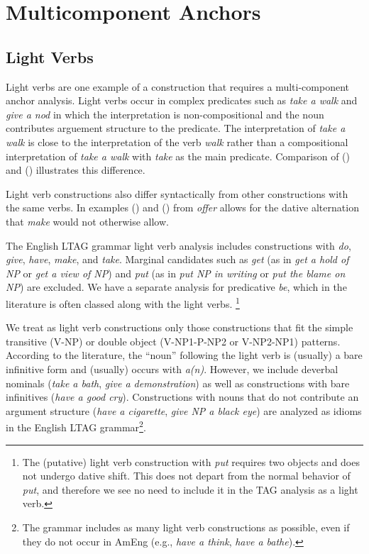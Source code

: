 \section{Multicomponent Anchors}

\subsection{Light Verbs}

Light verbs are one example of a construction that requires a
multi-component anchor analysis. Light verbs occur in complex
predicates such as {\it take a walk} and {\it give a nod} in which the
interpretation is non-compositional and the noun contributes arguement
structure to the predicate. The interpretation of {\it take a walk}
is close to the interpretation of the verb {\it walk} rather than a
compositional interpretation of {\it take a walk} with {\it take} as
the main predicate. Comparison of () and () illustrates
this difference.


Light verb constructions also differ syntactically from other
constructions with the same verbs. In examples () and () from \cite{Cattell84} {\it offer} allows for the dative alternation that {\it make} would not otherwise allow.



The English LTAG grammar light verb analysis includes constructions with {\it do}, {\it
give}, {\it have}, {\it make}, and {\it take}.  Marginal candidates such as
{\it get} (as in {\it get a hold of NP} or {\it get a view of NP}) and {\it
put} (as in {\it put NP in writing} or {\it put the blame on NP}) are
excluded.  We have a separate analysis for predicative {\it be}, which in
the literature is often classed along with the light verbs.
\footnote{The (putative) light verb construction with {\it put} requires
two objects and does not undergo dative shift.  This does not depart from
the normal behavior of {\it put}, and therefore we see no need to include
it in the TAG analysis as a light verb.}

We treat as light verb constructions only those constructions that fit
the simple transitive (V-NP) or double object (V-NP1-P-NP2 or
V-NP2-NP1) patterns.  According to the literature, the ``noun''
following the light verb is (usually) a bare infinitive form and
(usually) occurs with {\it a(n)}.  However, we include deverbal
nominals ({\it take a bath}, {\it give a demonstration}) as well as
constructions with bare infinitives ({\it have a good cry}).
Constructions with nouns that do not contribute an argument structure
({\it have a cigarette}, {\it give NP a black eye}) are analyzed as
idioms in the English LTAG grammar\footnote{The grammar includes as many light verb
constructions as possible, even if they do not occur in AmEng (e.g., {\it
have a think}, {\it have a bathe}).}.

